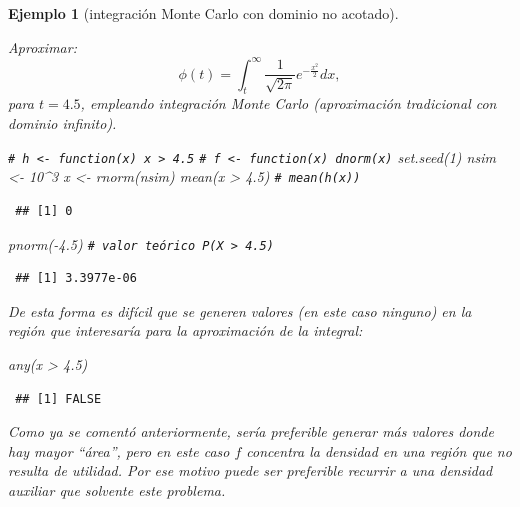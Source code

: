 \documentclass[
  10pt,
]{book}
\newenvironment{Shaded}{\begin{snugshade}}{\end{snugshade}}
\newcommand{\CommentTok}[1]{\textcolor[rgb]{0.56,0.35,0.01}{\textit{#1}}}
\newcommand{\DecValTok}[1]{\textcolor[rgb]{0.00,0.00,0.81}{#1}}
\newcommand{\FloatTok}[1]{\textcolor[rgb]{0.00,0.00,0.81}{#1}}
\newcommand{\FunctionTok}[1]{\textcolor[rgb]{0.00,0.00,0.00}{#1}}
\newcommand{\NormalTok}[1]{#1}
\newcommand{\OtherTok}[1]{\textcolor[rgb]{0.56,0.35,0.01}{#1}}
\newcommand{\SpecialCharTok}[1]{\textcolor[rgb]{0.00,0.00,0.00}{#1}}
\theoremstyle{break}
\newtheorem{example}{Ejemplo}[chapter]
\theoremstyle{nonumberplain}
\renewcommand{\CommentTok}[1]{\textcolor[rgb]{0.41,0.41,0.41}{\texttt{#1}}}
\begin{document}
\begin{example}[integración Monte Carlo con dominio no acotado]
\protect\hypertarget{exm:mc-intinf}{}\label{exm:mc-intinf}

Aproximar:
\[\phi(t)=\int_{t}^{\infty}\frac1{\sqrt{2\pi}}e^{-\frac{x^2}2}dx,\]
para \(t=4.5\), empleando integración Monte Carlo (aproximación tradicional con dominio infinito).

\begin{Shaded}
\begin{Highlighting}[]
\CommentTok{\# h \textless{}{-} function(x) x \textgreater{} 4.5}
\CommentTok{\# f \textless{}{-} function(x) dnorm(x)}
\FunctionTok{set.seed}\NormalTok{(}\DecValTok{1}\NormalTok{)}
\NormalTok{nsim }\OtherTok{\textless{}{-}} \DecValTok{10}\SpecialCharTok{\^{}}\DecValTok{3}
\NormalTok{x }\OtherTok{\textless{}{-}} \FunctionTok{rnorm}\NormalTok{(nsim)}
\FunctionTok{mean}\NormalTok{(x }\SpecialCharTok{\textgreater{}} \FloatTok{4.5}\NormalTok{) }\CommentTok{\# mean(h(x))}
\end{Highlighting}
\end{Shaded}

\begin{verbatim}
 ## [1] 0
\end{verbatim}

\begin{Shaded}
\begin{Highlighting}[]
\FunctionTok{pnorm}\NormalTok{(}\SpecialCharTok{{-}}\FloatTok{4.5}\NormalTok{)  }\CommentTok{\# valor teórico P(X \textgreater{} 4.5) }
\end{Highlighting}
\end{Shaded}

\begin{verbatim}
 ## [1] 3.3977e-06
\end{verbatim}

De esta forma es difícil que se generen valores (en este caso ninguno) en la región que interesaría para la aproximación de la integral:

\begin{Shaded}
\begin{Highlighting}[]
\FunctionTok{any}\NormalTok{(x }\SpecialCharTok{\textgreater{}} \FloatTok{4.5}\NormalTok{)}
\end{Highlighting}
\end{Shaded}

\begin{verbatim}
 ## [1] FALSE
\end{verbatim}

Como ya se comentó anteriormente, sería preferible generar más valores donde hay mayor ``área'', pero en este caso \(f\) concentra la densidad en una región que no resulta de utilidad.
Por ese motivo puede ser preferible recurrir a una densidad auxiliar que solvente este problema.
\end{example}
\end{document}
